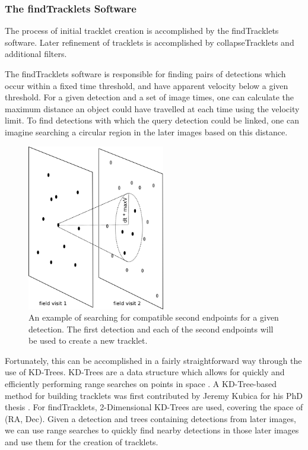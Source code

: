 \subsubsection{The findTracklets Software}

The process of initial tracklet creation is accomplished by the
findTracklets software.  Later refinement of tracklets is accomplished
by collapseTracklets and additional filters.


The findTracklets software is responsible for finding pairs of
detections which occur within a fixed time threshold, and have
apparent velocity below a given threshold.  For a given detection and
a set of image times, one can calculate the maximum distance an object
could have travelled at each time using the velocity limit.  To find
detections with which the query detection could be linked, one can
imagine searching a circular region in the later images based on this
distance.

\begin{figure}[ht!]
  \centering
    \includegraphics[width=6cm]{illustrations/findTracklets-onequery.png}
    \caption{ An example of searching for compatible second endpoints
      for a given detection.  The first detection and each of the
      second endpoints will be used to create a new tracklet.}
\label{findTrackletsIllustrated}
\end{figure}


Fortunately, this can be
accomplished in a fairly straightforward way through the use of
KD-Trees.  KD-Trees are a data structure which allows for quickly and
efficiently performing range searches on points in space
\citep{bentley_kdtrees}.  A KD-Tree-based method for building
tracklets was first contributed by Jeremy Kubica for his PhD thesis
\citep{kubica_thesis}.  For findTracklets, 2-Dimensional KD-Trees are
used, covering the space of (RA, Dec).  Given a detection and trees
containing detections from later images, we can use range searches to
quickly find nearby detections in those later images and use them for
the creation of tracklets.

